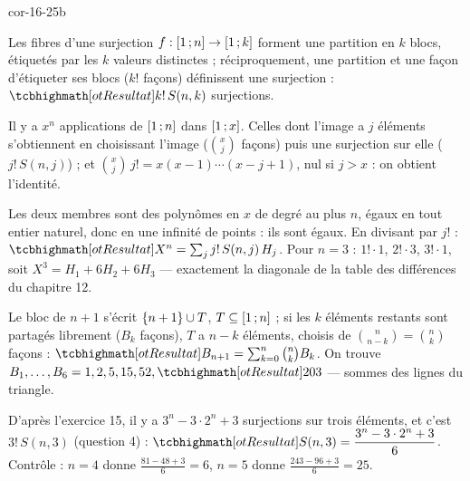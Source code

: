 \begin{blocLivre}{cor-16-25b}
\begin{corrigeSuite}
\begin{questions}[start=4]
  \item Les fibres d'une surjection $f:\mathopen{[}1\,{;}\,n\mathclose{]}\to\mathopen{[}1\,{;}\,k\mathclose{]}$ forment une
    partition en $k$ blocs, étiquetés par les $k$ valeurs distinctes ;
    réciproquement, une partition et une façon d'étiqueter ses blocs
    ($k!$ façons) définissent une surjection : $\res{k!\,S(n,k)}$
    surjections.
  \item Il y a $x^{n}$ applications de $\mathopen{[}1\,{;}\,n\mathclose{]}$ dans $\mathopen{[}1\,{;}\,x\mathclose{]}$. Celles
    dont l'image a $j$ éléments s'obtiennent en choisissant l'image
    ($\binom xj$ façons) puis une surjection sur elle ($j!\,S(n,j)$) ; et
    $\binom xj\,j!=x(x-1)\cdots(x-j+1)$, nul si $j>x$ : on obtient
    l'identité.
  \item Les deux membres sont des polynômes en $x$ de degré au plus $n$, égaux
    en tout entier naturel, donc en une infinité de points : ils sont
    égaux. En divisant par $j!$ : $\res{X^{n}=\sum_jj!\,S(n,j)\,H_j}$. Pour
    $n=3$ : $1!\cdot1$, $2!\cdot3$, $3!\cdot1$, soit
    $X^{3}=H_1+6H_2+6H_3$ — exactement la diagonale de la table des
    différences du chapitre 12.
\end{questions}
\begin{questions}[start=7]
  \item Le bloc de $n+1$ s'écrit $\left\{n+1\right\}\cup T$, $T\subseteq\mathopen{[}1\,{;}\,n\mathclose{]}$ ;
    si les $k$ éléments restants sont partagés librement ($B_k$ façons),
    $T$ a $n-k$ éléments, choisis de $\binom n{n-k}=\binom nk$ façons :
    $\res{B_{n+1}=\sum_{k=0}^{n}\binom nkB_k}$. On trouve
    $B_1,\dots,B_6=1,2,5,15,52,\res{203}$ — sommes des lignes du triangle.
  \item D'après l'exercice 15, il y a $3^{n}-3\cdot2^{n}+3$ surjections sur
    trois éléments, et c'est $3!\,S(n,3)$ (question 4) :
    $\res{S(n,3)=\dfrac{3^{n}-3\cdot2^{n}+3}{6}}$. Contrôle :
    $n=4$ donne $\frac{81-48+3}{6}=6$, $n=5$ donne $\frac{243-96+3}{6}=25$.
\end{questions}
\end{corrigeSuite}
\end{blocLivre}

